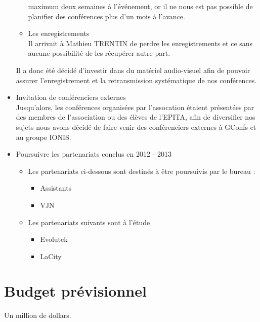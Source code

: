 \documentclass[12pt]{report}
\begin{document}
\begin{itemize}
\begin{itemize}
                                maximum deux semaines à l'événement, or il ne
                                nous est pas possible de planifier des
                                conférences plus d'un mois à l'avance.
                        \item Les enregistrements \\
                                Il arrivait à Mathieu TRENTIN de perdre les
                                enregistrements et ce sans aucune possibilité
                                de les récupérer autre part.
                \end{itemize}
                Il a donc été décidé d'investir dans du matériel audio-visuel
                afin de pouvoir assurer l'enregistrement et la retransmission
                systématique de nos conférences.
        \item Invitation de conférenciers externes\\
                Jusqu'alors, les conférences organisées par l'assocation
                étaient présentées par des membres de l'association ou des
                élèves de l'EPITA, afin de diversifier nos sujets nous avons
                décidé de faire venir des conférenciers externes à GConfs et au
                groupe IONIS.
        \item Poursuivre les partenariats conclus en 2012 - 2013
                \begin{itemize}
                        \item Les partenariats ci-dessous sont destinés à être
                                poursuivis par le bureau :
                        \begin{itemize}
                                \item Assistants
                                \item VJN
                        \end{itemize}
                \item Les partenariats suivants sont à l'étude 
                            \begin{itemize}
                                    \item Evolutek
                                    \item LaCity
                            \end{itemize}
                \end{itemize}
    \end{itemize}
    \section{Budget prévisionnel}
    Un million de dollars.
\end{document}
